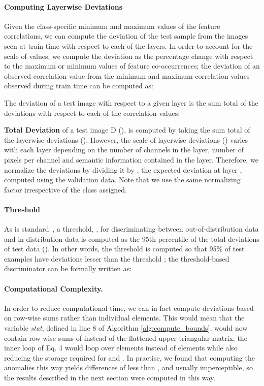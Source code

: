 \documentclass{article}
\begin{document}
\paragraph{Computing Layerwise Deviations} Given the class-specific minimum and maximum values of the  feature correlations, we can compute the deviation of the test sample from the images seen at train time with respect to each of the layers. In order to account for the scale of values, we compute the deviation as the percentage change with respect to the maximum or minimum values of feature co-occurrences; the deviation of an observed correlation value from the minimum and maximum correlation values observed during train time can be computed as:




The deviation of a test image with respect to a given layer  is the sum total of the deviations with respect to each of the  correlation values:


\textbf{Total Deviation} of a test image D (), is computed by taking the sum total of the layerwise deviations (). However, the scale of layerwise deviations () varies with each layer depending on the number of channels in the layer, number of pixels per channel and semantic information contained in the layer. Therefore, we normalize the deviations by dividing it by , the expected deviation at layer , computed using the validation data. Note that we use the same normalizing factor irrespective of the class assigned.

\paragraph{Threshold} As is standard~\citep{lee2018simple}, a threshold, , for discriminating between out-of-distribution data and in-distribution data is computed as the 95th percentile of the total deviations of test data (). In other words, the threshold is computed so that 95\% of test examples have deviations lesser than the threshold ; the threshold-based discriminator can be formally written as:

\paragraph{Computational Complexity.} In order to reduce computational time, we can in fact compute deviations based on row-wise sums rather than individual elements. This would mean that the variable \textit{stat}, defined in line 8 of Algorithm \ref{alg:compute_bounds}, would now contain row-wise sums of  instead of the flattened upper triangular matrix; the inner loop of Eq. 4 would loop over  elements instead of  elements while also reducing the storage required for  and . In practise, we found that computing the anomalies this way yields differences of less than , and usually imperceptible, so the results described in the next section were computed in this way.
\end{document}
